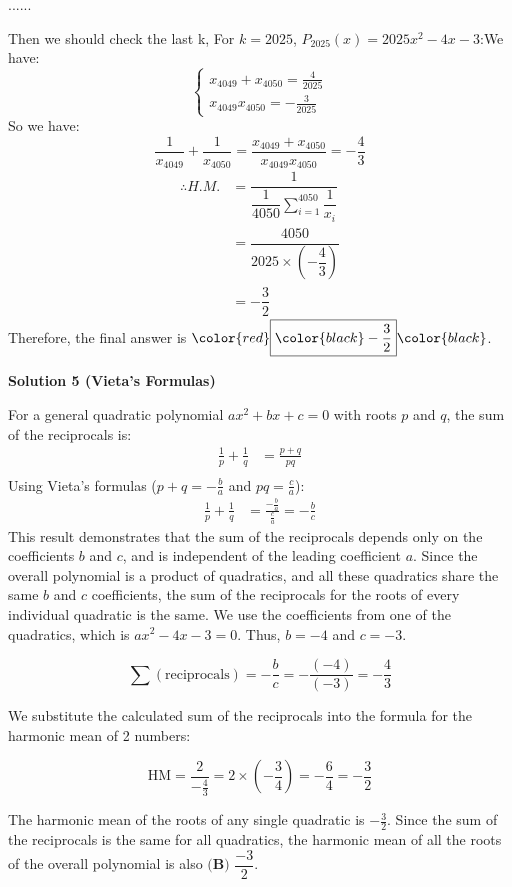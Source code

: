 \begin{enumerate}
 ......

 Then we should check the last k, For $k=2025$, $P_{2025}(x) = 2025x^{2} - 4x - 3$:We have:
 \[\begin{cases}  x_{4049}+x_{4050}=\frac{4}{2025}\\ x_{4049}x_{4050}=-\frac{3}{2025} \end{cases}\]So we have: 
 \[\dfrac{1}{x_{4049}}+\dfrac{1}{x_{4050}}=\dfrac{x_{4049}+x_{4050}}{x_{4049}x_{4050}}=-\dfrac{4}{3}\]
 \begin{align*} \therefore H.M.&=\dfrac{1}{\dfrac{1}{4050}\sum_{i=1}^{4050}\dfrac{1}{x_i}}\\ &=\dfrac{4050}{2025\times\left(-\dfrac{4}{3}\right)}\\ &=-\dfrac{3}{2} \end{align*}
Therefore, the final answer is $\color{red}\boxed{\color{black}-\dfrac{3}{2}}\color{black}$.

 



\textbf{Solution 5 (Vieta's Formulas)}

For a general quadratic polynomial $ax^2 + bx + c = 0$ with roots $p$ and $q$, the sum of the reciprocals is:\begin{align*}\frac{1}{p} + \frac{1}{q} &= \frac{p+q}{pq} \\\end{align*}
Using Vieta's formulas ($p+q = -\frac{b}{a}$ and $pq = \frac{c}{a}$):\begin{align*}\frac{1}{p} + \frac{1}{q} &= \frac{-\frac{b}{a}}{\frac{c}{a}} = -\frac{b}{c}\end{align*}
This result demonstrates that the sum of the reciprocals depends only on the coefficients $b$ and $c$, and is independent of the leading coefficient $a$. Since the overall polynomial is a product of quadratics, and all these quadratics share the same $b$ and $c$ coefficients, the sum of the reciprocals for the roots of every individual quadratic is the same. We use the coefficients from one of the quadratics, which is $ax^2 - 4x - 3 = 0$. Thus, $b=-4$ and $c=-3$.

 
 \[\sum (\text{reciprocals}) = -\frac{b}{c} = -\frac{(-4)}{(-3)} = -\frac{4}{3}\]

 We substitute the calculated sum of the reciprocals into the formula for the harmonic mean of 2 numbers:

 
 \[\text{HM} = \frac{2}{-\frac{4}{3}} = 2 \times \left(-\frac{3}{4}\right) = -\frac{6}{4} = -\frac{3}{2}\]

 The harmonic mean of the roots of any single quadratic is $-\frac{3}{2}$. Since the sum of the reciprocals is the same for all quadratics, the harmonic mean of all the roots of the overall polynomial is also $\boxed{\textbf{(B) }\dfrac{-3}{2}}$.


\end{enumerate}
